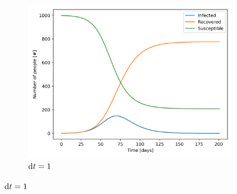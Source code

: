\documentclass{article}
\begin{document}
\begin{figure}
\begin{subfigure}{0.3\textwidth}
    \includegraphics[width=\linewidth]{./Images/SIR_plot_dt1.png}
    \caption{${\rm d}t=1$}
    \label{subfig:plot3}
  \end{subfigure}
  
  \medskip %
  

\end{figure}
\end{document}
